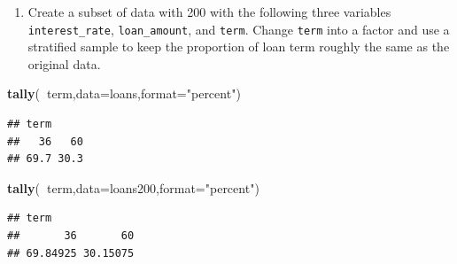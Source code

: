 \documentclass[
]{book}
\newenvironment{Shaded}{\begin{snugshade}}{\end{snugshade}}
\newcommand{\DataTypeTok}[1]{\textcolor[rgb]{0.13,0.29,0.53}{#1}}
\newcommand{\DecValTok}[1]{\textcolor[rgb]{0.00,0.00,0.81}{#1}}
\newcommand{\FloatTok}[1]{\textcolor[rgb]{0.00,0.00,0.81}{#1}}
\newcommand{\KeywordTok}[1]{\textcolor[rgb]{0.13,0.29,0.53}{\textbf{#1}}}
\newcommand{\NormalTok}[1]{#1}
\newcommand{\OperatorTok}[1]{\textcolor[rgb]{0.81,0.36,0.00}{\textbf{#1}}}
\newcommand{\StringTok}[1]{\textcolor[rgb]{0.31,0.60,0.02}{#1}}
\providecommand{\tightlist}{%
  \setlength{\itemsep}{0pt}\setlength{\parskip}{0pt}}
\begin{document}
\begin{enumerate}
\def\labelenumi{\alph{enumi}.}
\setcounter{enumi}{1}
\tightlist
\item
  Create a subset of data with 200 with the following three variables \texttt{interest\_rate}, \texttt{loan\_amount}, and \texttt{term}. Change \texttt{term} into a factor and use a stratified sample to keep the proportion of loan term roughly the same as the original data.
\end{enumerate}

\begin{Shaded}
\begin{Highlighting}[]
\KeywordTok{tally}\NormalTok{(}\OperatorTok{~}\NormalTok{term,}\DataTypeTok{data=}\NormalTok{loans,}\DataTypeTok{format=}\StringTok{"percent"}\NormalTok{)}
\end{Highlighting}
\end{Shaded}

\begin{verbatim}
## term
##   36   60 
## 69.7 30.3
\end{verbatim}

\begin{Shaded}
\end{Shaded}

\begin{Shaded}
\begin{Highlighting}[]
\KeywordTok{tally}\NormalTok{(}\OperatorTok{~}\NormalTok{term,}\DataTypeTok{data=}\NormalTok{loans200,}\DataTypeTok{format=}\StringTok{"percent"}\NormalTok{)}
\end{Highlighting}
\end{Shaded}

\begin{verbatim}
## term
##       36       60 
## 69.84925 30.15075
\end{verbatim}
\end{document}
